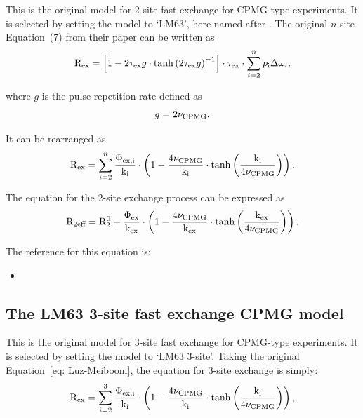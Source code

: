 This is the original model for 2-site fast exchange for CPMG-type experiments.
It is selected by setting the model to `LM63', here named after \citet{LuzMeiboom63}.
The original $n$-site Equation~(7) from their paper can be written as
\begin{equation}
    \mathrm{R}_\textrm{ex} = \left[ 1 - 2\tau_\textrm{ex} g \cdot \tanh \left( 2\tau_\textrm{ex} g \right)^{-1} \right] \cdot \tau_\textrm{ex} \cdot \sum_{i=2}^n p_\textrm{i}\Delta\omega_{i},
\end{equation}

where $g$ is the pulse repetition rate defined as
\begin{equation}
    g = 2\nu_\textrm{CPMG}.
\end{equation}

It can be rearranged as
\begin{equation} \label{eq: Luz-Meiboom}
    \mathrm{R}_\textrm{ex} = \sum_{i=2}^n \frac{\Phi_\textrm{ex,i}}{\textrm{k}_\textrm{i}} \cdot \left( 1 - \frac{4\nu_\textrm{CPMG}}{\textrm{k}_\textrm{i}} \cdot \tanh \left( \frac{\textrm{k}_\textrm{i}}{4\nu_\textrm{CPMG}} \right) \right).
\end{equation}


The equation for the 2-site exchange process can be expressed as
\begin{equation}
    \mathrm{R}_\textrm{2eff} = \mathrm{R}_2^0 + \frac{\Phi_\textrm{ex}}{\textrm{k}_\textrm{ex}} \cdot \left( 1 - \frac{4\nu_\textrm{CPMG}}{\textrm{k}_\textrm{ex}} \cdot \tanh \left( \frac{\textrm{k}_\textrm{ex}}{4\nu_\textrm{CPMG}} \right) \right).
\end{equation}

The reference for this equation is:
\begin{itemize}
\item {}
\end{itemize}



\subsection{The LM63 3-site fast exchange CPMG model}
\label{sect: dispersion: LM63 3-site model}

This is the original \citet{LuzMeiboom63} model for 3-site fast exchange for CPMG-type experiments.
It is selected by setting the model to `LM63 3-site'.
Taking the original Equation~\ref{eq: Luz-Meiboom}, the equation for 3-site exchange is simply:
\begin{equation}
    \mathrm{R}_\textrm{ex} = \sum_{i=2}^3 \frac{\Phi_\textrm{ex,i}}{\textrm{k}_\textrm{i}} \cdot \left( 1 - \frac{4\nu_\textrm{CPMG}}{\textrm{k}_\textrm{i}} \cdot \tanh \left( \frac{\textrm{k}_\textrm{i}}{4\nu_\textrm{CPMG}} \right) \right) ,
\end{equation}

